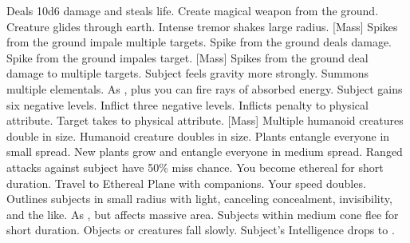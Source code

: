     {Deals 10d6 damage and steals life.}
    {Create magical weapon from the ground.}
    {Creature glides through earth. }
    {Intense tremor shakes large radius.}
[Mass]
    {Spikes from the ground impale multiple targets.}
    {Spike from the ground deals damage. }
    {Spike from the ground impales target.}
    {[Mass] Spikes from the ground deal damage to multiple targets.}
    {Subject feels gravity more strongly.}
    {Summons multiple elementals.}
    {As , plus you can fire rays of absorbed energy.}
    {Subject gains six negative levels.}
    {Inflict three negative levels.}
    {Inflicts  penalty to physical attribute.}
    {Target takes  to physical attribute.}
[Mass]
    {Multiple humanoid creatures double in size.}
    {Humanoid creature doubles in size.}
    {Plants entangle everyone in small spread.}
    {New plants grow and entangle everyone in medium spread.}
    {Ranged attacks against subject have 50\% miss chance.}
    {You become ethereal for short duration.}
    {Travel to Ethereal Plane with companions.}
    {Your speed doubles.}
    {Outlines subjects in small radius with light, canceling concealment, invisibility, and the like.}
    {As , but affects massive area.}
    {Subjects within medium cone flee for short duration.}
    {Objects or creatures fall slowly.}
    {Subject's Intelligence drops to .}
